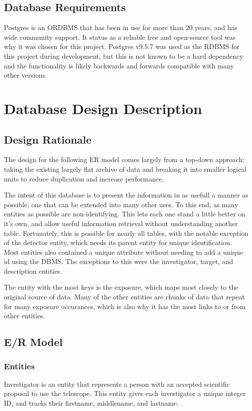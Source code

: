 \documentclass[a4paper,11pt]{article}
\begin{document}
\subsection{Database Requirements}
Postgres is an ORDBMS that has been in use for more than 20 years, and has wide community support.  It status as a reliable free and open-source tool was why it was chosen for this project.  Postgres v9.5.7 was used as the RDBMS for this project during development, but this is not known to be a hard dependency and the functionality is likely backwards and forwards compatible with many other versions.

\section{Database Design Description}
\subsection{Design Rationale}
The design for the following ER model comes largely from a top-down approach; taking the existing largely flat archive of data and breaking it into smaller logical units to reduce duplication and increase performance.

The intent of this database is to present the information in as usefull a manner as possible; one that can be extended into many other uses.  To this end, as many entities as possible are non-identifying.  This lets each one stand a little better on it's own, and allow useful information retrieval without understanding another table.  Fortunately, this is possible for nearly all tables, with the notable exception of the detector entity, which needs its parent entity for unique identification.  Most entities also contained a unique attribute without needing to add a unique id using the DBMS.  The exceptions to this were the investigator, target, and description entities.

The entity with the most keys is the exposure, which maps most closely to the original source of data.  Many of the other entities are chunks of data that repeat for many exposure occurances, which is also why it has the most links to or from other entities.  

\subsection{E/R Model}
\subsubsection{Entities}
Investigator is an entity that represents a person with an accepted scientific proposal to use the telescope.  This entity gives each investigator a unique integer ID, and tracks their firstname, middlename, and lastname.
\end{document}
